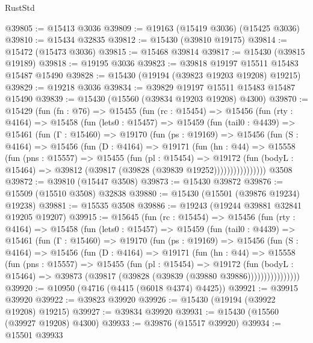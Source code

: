 \begin{lexlean}{RustStd}
\begin{coremodule}
@39805 := @15413 @3036
@39809 := @19163 (@15419 @3036) (@15425 @3036)
@39810 := @15434 @32835
@39812 := @15430 (@39810 @19175)
@39814 := @15472 (@15473 @3036)
@39815 := @15468 @39814
@39817 := @15430 (@39815 @19189)
@39818 := @19195 @3036
@39823 := @39818 @19197 @15511 @15483 @15487 @15490
@39828 := @15430 (@19194 (@39823 @19203 @19208) @19215)
@39829 := @19218 @3036
@39834 := @39829 @19197 @15511 @15483 @15487 @15490
@39839 := @15430 (@15560 (@39834 @19203 @19208) @4300)
@39870 := @15429
    (fun (fn : @76) =>
    @15455
      (fun (rc : @15454) =>
      @15456
        (fun (rty : @4164) =>
        @15458
          (fun (lets0 : @15457) =>
          @15459
            (fun (tail0 : @4439) =>
            @15461
              (fun (Γ : @15460) =>
              @19170
                (fun (ps : @19169) =>
                @15456
                  (fun (S : @4164) =>
                  @15456
                    (fun (D : @4164) =>
                    @19171
                      (fun (hn : @44) =>
                      @15558
                        (fun (pns : @15557) =>
                        @15455
                          (fun (pl : @15454) =>
                          @19172
                            (fun (bodyL : @15464) =>
                            @39812 (@39817 (@39828 (@39839 @19252))))))))))))))))
    @3508
@39872 := @39810 (@15447 @3508)
@39873 := @15430 @39872
@39876 := @15509 (@15510 @3508) @32838
@39880 := @15430 (@15501 (@39876 @19234) @19238)
@39881 := @15535 @3508
@39886 := @19243 (@19244 @39881 @32841 @19205 @19207)
@39915 := @15645
    (fun (rc : @15454) =>
    @15456
      (fun (rty : @4164) =>
      @15458
        (fun (lets0 : @15457) =>
        @15459
          (fun (tail0 : @4439) =>
          @15461
            (fun (Γ : @15460) =>
            @19170
              (fun (ps : @19169) =>
              @15456
                (fun (S : @4164) =>
                @15456
                  (fun (D : @4164) =>
                  @19171
                    (fun (hn : @44) =>
                    @15558
                      (fun (pns : @15557) =>
                      @15455
                        (fun (pl : @15454) =>
                        @19172
                          (fun (bodyL : @15464) =>
                          @39873 (@39817 (@39828 (@39839 (@39880 @39886))))))))))))))))
@39920 := @10950 (@4716 (@4415 (@6018 @4374) @4425))
@39921 := @39915 @39920
@39922 := @39823 @39920
@39926 := @15430 (@19194 (@39922 @19208) @19215)
@39927 := @39834 @39920
@39931 := @15430 (@15560 (@39927 @19208) @4300)
@39933 := @39876 (@15517 @39920)
@39934 := @15501 @39933

\end{coremodule}
\end{lexlean}
